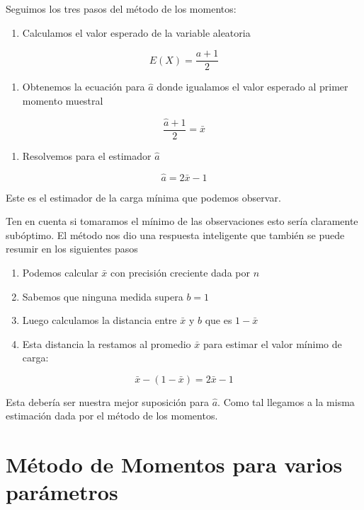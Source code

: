 \documentclass[
]{book}
\providecommand{\tightlist}{%
  \setlength{\itemsep}{0pt}\setlength{\parskip}{0pt}}
\begin{document}
Seguimos los tres pasos del método de los momentos:

\begin{enumerate}
\def\labelenumi{\arabic{enumi}.}
\tightlist
\item
  Calculamos el valor esperado de la variable aleatoria
\end{enumerate}

\[E(X)=\frac{a+1}{2}\]

\begin{enumerate}
\def\labelenumi{\arabic{enumi}.}
\setcounter{enumi}{1}
\tightlist
\item
  Obtenemos la ecuación para \(\hat{a}\) donde igualamos el valor esperado al primer momento muestral
\end{enumerate}

\[\frac{\hat{a}+1}{2}=\bar{x}\]

\begin{enumerate}
\def\labelenumi{\arabic{enumi}.}
\setcounter{enumi}{2}
\tightlist
\item
  Resolvemos para el estimador \(\hat{a}\)
\end{enumerate}

\[\hat{a}=2\bar{x}-1\]

Este es el estimador de la carga mínima que podemos observar.

Ten en cuenta si tomaramos el mínimo de las observaciones esto sería claramente subóptimo. El método nos dio una respuesta inteligente que también se puede resumir en los siguientes pasos

\begin{enumerate}
\def\labelenumi{\alph{enumi})}
\tightlist
\item
  Podemos calcular \(\bar{x}\) con precisión creciente dada por \(n\)
\item
  Sabemos que ninguna medida supera \(b=1\)
\item
  Luego calculamos la distancia entre \(\bar{x}\) y \(b\) que es \(1-\bar{x}\)
\item
  Esta distancia la restamos al promedio \(\bar{x}\) para estimar el valor mínimo de carga:
\end{enumerate}

\[\bar{x}-(1-\bar{x})=2\bar{x}-1\]

Esta debería ser nuestra mejor suposición para \(\hat{a}\). Como tal llegamos a la misma estimación dada por el método de los momentos.

\hypertarget{muxe9todo-de-momentos-para-varios-paruxe1metros}{%
\section{Método de Momentos para varios parámetros}\label{muxe9todo-de-momentos-para-varios-paruxe1metros}}
\end{document}
